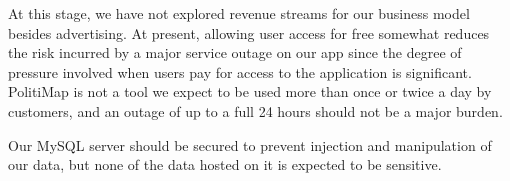 \documentclass{article}
\begin{document}
At this stage, we have not explored revenue streams for our business
model besides advertising. At present, allowing user access for free
somewhat reduces the risk incurred by a major service outage on our
app since the degree of pressure involved when users pay for access to
the application is significant. PolitiMap is not a tool we expect to
be used more than once or twice a day by customers, and an outage of
up to a full 24 hours should not be a major burden.

Our MySQL server should be secured to prevent injection and
manipulation of our data, but none of the data hosted on it is
expected to be sensitive.

\begin{appendix}
\printbibliography
\end{appendix}
\end{document}
